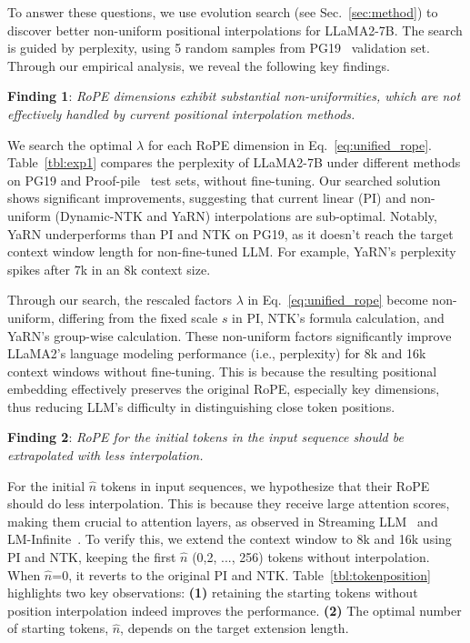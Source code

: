 \documentclass{article}
\theoremstyle{plain}
\theoremstyle{definition}
\theoremstyle{remark}
\begin{document}
To answer these questions, we use evolution search (see Sec.~\ref{sec:method}) to discover better non-uniform positional interpolations for LLaMA2-7B. The search is guided by perplexity, using 5 random samples from PG19~\cite{pg19} validation set.  Through our empirical analysis, we reveal the following key findings. 




\noindent\textbf{Finding 1}: \textit{RoPE dimensions exhibit substantial non-uniformities, which are not effectively handled by current positional interpolation methods.}


We  search the optimal $\lambda$ for each RoPE dimension in Eq.~\ref{eq:unified_rope}. Table~\ref{tbl:exp1} compares the perplexity of LLaMA2-7B under different  methods on PG19 and Proof-pile~\cite{proof-pile} test sets, without fine-tuning. Our searched solution shows significant improvements, suggesting that current linear (PI) and non-uniform (Dynamic-NTK and YaRN) interpolations are sub-optimal. Notably, YaRN underperforms  than PI and NTK on PG19, as it doesn't reach the target context window length for non-fine-tuned LLM. For example, YaRN's perplexity spikes after 7k in an 8k context size. 

Through our search,  the rescaled factors $\lambda$ in Eq.~\ref{eq:unified_rope} become non-uniform, differing from the fixed scale $s$ in PI, NTK's formula calculation, and YaRN's group-wise calculation. These non-uniform factors significantly improve LLaMA2's language modeling performance (i.e., perplexity) for 8k and 16k context windows without fine-tuning. This is because the resulting positional embedding effectively preserves the original RoPE, especially key dimensions, thus reducing LLM's difficulty in distinguishing close token positions.




\noindent\textbf{Finding 2}: \textit{RoPE for the initial tokens in the input sequence should be extrapolated with less interpolation.} 

For the initial $\hat{n}$ tokens in input sequences, we hypothesize that their RoPE should do less interpolation. This is because they receive large attention scores, making them crucial to attention layers, as observed in  Streaming LLM~\cite{streamingllm} and LM-Infinite~\cite{han2023lminfinite}. To verify this, 
 we extend the context window to 8k and 16k using PI and NTK, keeping the first  $\hat n$ (0,2, ..., 256) tokens without interpolation. When $\hat n$=0, it reverts to the original PI and NTK. Table~\ref{tbl:tokenposition} highlights two key observations: \textbf{(1)} retaining the starting tokens without position interpolation indeed improves the performance. \textbf{(2)} The optimal number of starting tokens, $\hat n$, depends on the target extension length. 
\end{document}
